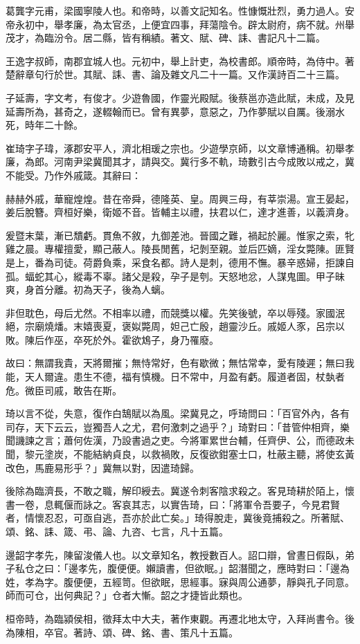 \begin{pinyinscope}
葛龔字元甫，梁國寧陵人也。和帝時，以善文記知名。性慷慨壯烈，勇力過人。安帝永初中，舉孝廉，為太官丞，上便宜四事，拜蕩陰令。辟太尉府，病不就。州舉茂才，為臨汾令。居二縣，皆有稱績。著文、賦、碑、誄、書記凡十二篇。

王逸字叔師，南郡宜城人也。元初中，舉上計吏，為校書郎。順帝時，為侍中。著楚辭章句行於世。其賦、誄、書、論及雜文凡二十一篇。又作漢詩百二十三篇。

子延壽，字文考，有俊才。少遊魯國，作靈光殿賦。後蔡邕亦造此賦，未成，及見延壽所為，甚奇之，遂輟翰而已。曾有異夢，意惡之，乃作夢賦以自厲。後溺水死，時年二十餘。

崔琦字子瑋，涿郡安平人，濟北相瑗之宗也。少遊學京師，以文章博通稱。初舉孝廉，為郎。河南尹梁冀聞其才，請與交。冀行多不軌，琦數引古今成敗以戒之，冀不能受。乃作外戚箴。其辭曰：

赫赫外戚，華寵煌煌。昔在帝舜，德隆英、皇。周興三母，有莘崇湯。宣王晏起，姜后脫簪。齊桓好樂，衛姬不音。皆輔主以禮，扶君以仁，達才進善，以義濟身。

爰暨末葉，漸已穨虧。貫魚不敘，九御差池。晉國之難，禍起於麗。惟家之索，牝雞之晨。專權擅愛，顯己蔽人。陵長閒舊，圮剝至親。並后匹嫡，淫女斃陳。匪賢是上，番為司徒。荷爵負乘，采食名都。詩人是刺，德用不憮。暴辛惑婦，拒諫自孤。蝠蛇其心，縱毒不辜。諸父是殺，孕子是刳。天怒地忿，人謀鬼圖。甲子昧爽，身首分離。初為天子，後為人螭。

非但耽色，母后尤然。不相率以禮，而競獎以權。先笑後號，卒以辱殘。家國泯絕，宗廟燒燔。末嬉喪夏，褒姒斃周，妲己亡殷，趙靈沙丘。戚姬人豕，呂宗以敗。陳后作巫，卒死於外。霍欲鴆子，身乃罹廢。

故曰：無謂我貴，天將爾摧；無恃常好，色有歇微；無怙常幸，愛有陵遲；無曰我能，天人爾違。患生不德，福有慎機。日不常中，月盈有虧。履道者固，杖埶者危。微臣司戚，敢告在斯。

琦以言不從，失意，復作白鵠賦以為風。梁冀見之，呼琦問曰：「百官外內，各有司存，天下云云，豈獨吾人之尤，君何激刺之過乎？」琦對曰：「昔管仲相齊，樂聞譏諫之言；蕭何佐漢，乃設書過之吏。今將軍累世台輔，任齊伊、公，而德政未聞，黎元塗炭，不能結納貞良，以救禍敗，反復欲鉗塞士口，杜蔽主聽，將使玄黃改色，馬鹿易形乎？」冀無以對，因遣琦歸。

後除為臨濟長，不敢之職，解印綬去。冀遂令刺客陰求殺之。客見琦耕於陌上，懷書一卷，息輒偃而詠之。客哀其志，以實告琦，曰：「將軍令吾要子，今見君賢者，情懷忍忍，可亟自逃，吾亦於此亡矣。」琦得脫走，冀後竟捕殺之。所著賦、頌、銘、誄、箴、弔、論、九咨、七言，凡十五篇。

邊韶字孝先，陳留浚儀人也。以文章知名，教授數百人。詔口辯，曾晝日假臥，弟子私仓之曰：「邊孝先，腹便便。嬾讀書，但欲眠。」韶潛聞之，應時對曰：「邊為姓，孝為字。腹便便，五經笥。但欲眠，思經事。寐與周公通夢，靜與孔子同意。師而可仓，出何典記？」仓者大慚。韶之才捷皆此類也。

桓帝時，為臨潁侯相，徵拜太中大夫，著作東觀。再遷北地太守，入拜尚書令。後為陳相，卒官。著詩、頌、碑、銘、書、策凡十五篇。


\end{pinyinscope}